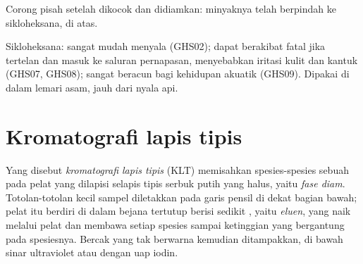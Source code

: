 \begin{omfigure}

{\small Corong pisah setelah dikocok dan didiamkan: minyaknya telah
berpindah ke sikloheksana, di atas.}
\end{omfigure}

\begin{safety}{}
Sikloheksana: sangat mudah menyala (GHS02); dapat berakibat fatal jika
tertelan dan masuk ke saluran pernapasan, menyebabkan iritasi kulit dan
kantuk (GHS07, GHS08); sangat beracun bagi kehidupan akuatik (GHS09).
Dipakai di dalam lemari asam, jauh dari nyala api.
\end{safety}

\section{Kromatografi lapis tipis}

\begin{definition}\label{def:g10:chemical-species:tlc}
Yang disebut \emph{kromatografi lapis tipis}
(KLT) memisahkan spesies-spesies sebuah  pada pelat yang
dilapisi selapis tipis serbuk putih yang halus, yaitu
\emph{fase diam}. Totolan-totolan kecil sampel
diletakkan pada garis pensil di dekat bagian bawah; pelat itu berdiri di
dalam bejana tertutup berisi sedikit , yaitu
\emph{eluen}, yang naik melalui pelat dan membawa setiap
spesies sampai ketinggian yang bergantung pada spesiesnya. Bercak yang
tak berwarna kemudian ditampakkan, di bawah sinar ultraviolet atau
dengan uap iodin.
\end{definition}

